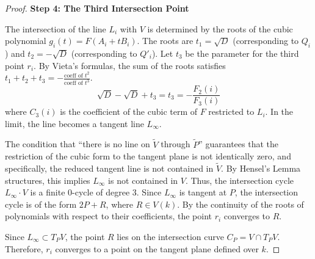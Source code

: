 \documentclass[10pt,a4paper]{amsart}
\begin{document}
\begin{proof}
\vspace{0.5em}
\noindent\textbf{Step 4: The Third Intersection Point}

    The intersection of the line $L_i$ with $V$ is determined by the roots of the cubic polynomial $g_i(t) = F(A_i + t B_i)$. The roots are $t_1 = \sqrt{D}$ (corresponding to $Q_i$) and $t_2 = -\sqrt{D}$ (corresponding to $Q'_i$). Let $t_3$ be the parameter for the third point $r_i$.
    By Vieta's formulas, the sum of the roots satisfies $t_1 + t_2 + t_3 = - \frac{\text{coeff of } t^2}{\text{coeff of } t^3}$.
    \[ \sqrt{D} - \sqrt{D} + t_3 = t_3 = - \frac{F_2(i)}{F_3(i)} \]
    where $C_3(i)$ is the coefficient of the cubic term of $F$ restricted to $L_i$. In the limit, the line becomes a tangent line $L_\infty$.
    
    The condition that ``there is no line on $\tilde{V}$ through $\tilde{P}$'' guarantees that the restriction of the cubic form to the tangent plane is not identically zero, and specifically, the reduced tangent line is not contained in $\tilde{V}$. By Hensel's Lemma structures, this implies $L_\infty$ is not contained in $V$. Thus, the intersection cycle $L_\infty \cdot V$ is a finite 0-cycle of degree 3.
    Since $L_\infty$ is tangent at $P$, the intersection cycle is of the form $2P + R$, where $R \in V(k)$.
    By the continuity of the roots of polynomials with respect to their coefficients, the point $r_i$ converges to $R$.
    
    Since $L_\infty \subset T_P V$, the point $R$ lies on the intersection curve $C_P = V \cap T_P V$.
    Therefore, $r_i$ converges to a point on the tangent plane defined over $k$.
\end{proof}
\end{document}
